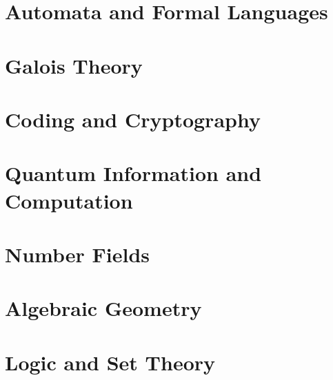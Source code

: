 \chapter{Automata and Formal Languages}

\chapter{Galois Theory}

\chapter{Coding and Cryptography}

\chapter{Quantum Information and Computation}

\chapter{Number Fields}

\chapter{Algebraic Geometry}

\chapter{Logic and Set Theory}



